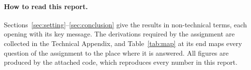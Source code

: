 \paragraph{How to read this report.}
Sections~\ref{sec:setting}--\ref{sec:conclusion} give the results in non-technical terms, each opening with its key message. The derivations required by the assignment are collected in the Technical Appendix, and Table~\ref{tab:map} at its end maps every question of the assignment to the place where it is answered. All figures are produced by the attached code, which reproduces every number in this report.

